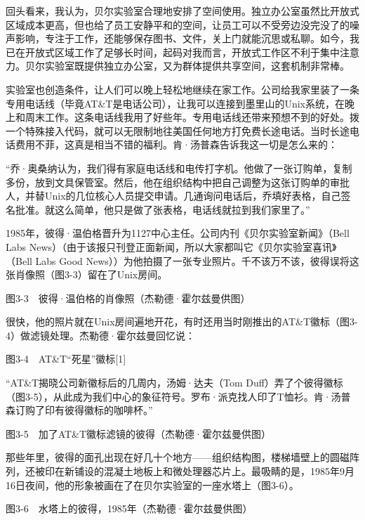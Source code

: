 \documentclass[a4paper,12pt,UTF8,twoside]{ctexbook}
\begin{document}
{回头看来，我认为，贝尔实验室合理地安排了空间使用。独立办公室虽然比开放式区域成本更高，但也给了员工安静平和的空间，让员工可以不受旁边没完没了的噪声影响，专注于工作，还能够保存图书、文件，关上门就能沉思或私聊。如今，我已在开放式区域工作了足够长时间，起码对我而言，开放式工作区不利于集中注意力。贝尔实验室既提供独立办公室，又为群体提供共享空间，这套机制非常棒。

实验室也创造条件，让人们可以晚上轻松地继续在家工作。公司给我家里装了一条专用电话线（毕竟AT\&T是电话公司），让我可以连接到墨里山的Unix系统，在晚上和周末工作。这条电话线我用了好些年。专用电话线还带来预想不到的好处。拨一个特殊接入代码，就可以无限制地往美国任何地方打免费长途电话。当时长途电话费用不菲，这真是相当不错的福利。肯·汤普森告诉我这一切是怎么来的：

“乔·奥桑纳认为，我们得有家庭电话线和电传打字机。他做了一张订购单，复制多份，放到文具保管室。然后，他在组织结构中把自己调整为这张订购单的审批人，并替Unix的几位核心人员提交申请。几通询问电话后，乔填好表格，自己签名批准。就这么简单，他只是做了张表格，电话线就拉到我们家里了。”



1985年，彼得·温伯格晋升为1127中心主任。公司内刊《贝尔实验室新闻》（Bell Labs News）（由于该报只刊登正面新闻，所以大家都叫它《贝尔实验室喜讯》（Bell Labs Good News））为他拍摄了一张专业照片。千不该万不该，彼得误将这张肖像照（图3-3）留在了Unix房间。



图3-3　彼得·温伯格的肖像照（杰勒德·霍尔兹曼供图）

很快，他的照片就在Unix房间遍地开花，有时还用当时刚推出的AT\&T徽标（图3-4）做滤镜处理。杰勒德·霍尔兹曼回忆说：



图3-4　AT\&T“死星”徽标[1]

“AT\&T揭晓公司新徽标后的几周内，汤姆·达夫（Tom Duff）弄了个彼得徽标（图3-5），从此成为我们中心的象征符号。罗布·派克找人印了T恤衫。肯·汤普森订购了印有彼得徽标的咖啡杯。”





图3-5　加了AT\&T徽标滤镜的彼得（杰勒德·霍尔兹曼供图）

那些年里，彼得的面孔出现在好几十个地方——组织结构图，楼梯墙壁上的圆磁阵列，还被印在新铺设的混凝土地板上和微处理器芯片上。最吸睛的是，1985年9月16日夜间，他的形象被画在了在贝尔实验室的一座水塔上（图3-6）。



图3-6　水塔上的彼得，1985年（杰勒德·霍尔兹曼供图）

}
\end{document}
